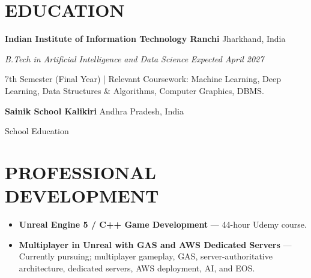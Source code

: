 \documentclass[10pt,letterpaper]{article}
\begin{document}

\section{EDUCATION}

\textbf{Indian Institute of Information Technology Ranchi}
\hfill
Jharkhand, India

\vspace{1pt}

\textit{B.Tech in Artificial Intelligence and Data Science}
\hfill
\textit{Expected April 2027}

\vspace{1pt}

7th Semester (Final Year)
\quad|\quad
Relevant Coursework:
Machine Learning, Deep Learning, Data Structures \& Algorithms,
Computer Graphics, DBMS.

\vspace{4pt}

\textbf{Sainik School Kalikiri}
\hfill
Andhra Pradesh, India

\vspace{1pt}

School Education


\section{PROFESSIONAL DEVELOPMENT}

\begin{itemize}

    \item
    \textbf{Unreal Engine 5 / C++ Game Development} ---
    44-hour Udemy course.

    \item
    \textbf{Multiplayer in Unreal with GAS and AWS Dedicated Servers} ---
    Currently pursuing; multiplayer gameplay, GAS, server-authoritative
    architecture, dedicated servers, AWS deployment, AI, and EOS.

\end{itemize}

\end{document}
